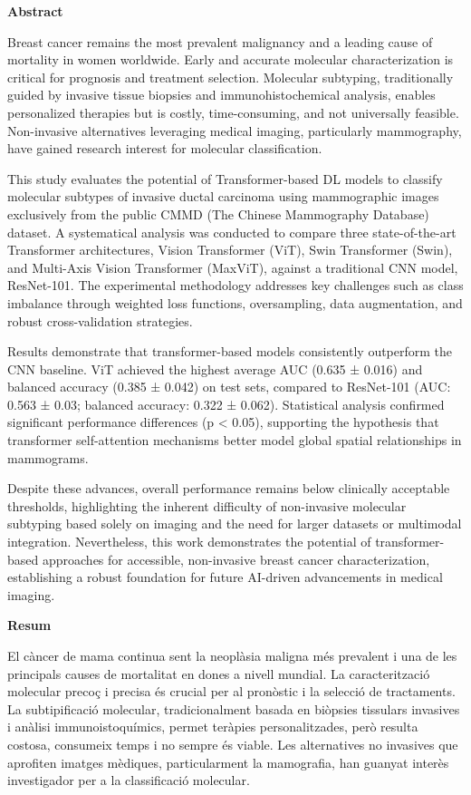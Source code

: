 \documentclass[a4paper,10pt]{book}
\begin{document}
\newpage
{}
\noindent \textbf{\large Abstract}

Breast cancer remains the most prevalent malignancy and a leading cause of mortality in women worldwide. Early and accurate molecular characterization is critical for prognosis and treatment selection. Molecular subtyping, traditionally guided by invasive tissue biopsies and immunohistochemical analysis, enables personalized therapies but is costly, time-consuming, and not universally feasible. Non-invasive alternatives leveraging medical imaging, particularly mammography, have gained research interest for molecular classification.

This study evaluates the potential of Transformer-based DL models to classify molecular subtypes of invasive ductal carcinoma using mammographic images exclusively from the public CMMD (The Chinese Mammography Database)  dataset. A systematical analysis was conducted to compare three state-of-the-art Transformer architectures, Vision Transformer (ViT), Swin Transformer (Swin), and Multi-Axis Vision Transformer (MaxViT), against a traditional CNN model, ResNet-101. The experimental methodology addresses key challenges such as class imbalance through weighted loss functions, oversampling, data augmentation, and robust cross-validation strategies.

Results demonstrate that transformer-based models consistently outperform the CNN baseline. ViT achieved the highest average AUC (0.635 ± 0.016) and balanced accuracy (0.385 ± 0.042) on test sets, compared to ResNet-101 (AUC: 0.563 ± 0.03; balanced accuracy: 0.322 ± 0.062). Statistical analysis confirmed significant performance differences (p < 0.05), supporting the hypothesis that transformer self-attention mechanisms better model global spatial relationships in mammograms.

Despite these advances, overall performance remains below clinically acceptable thresholds, highlighting the inherent difficulty of non-invasive molecular subtyping based solely on imaging and the need for larger datasets or multimodal integration. Nevertheless, this work demonstrates the potential of transformer-based approaches for accessible, non-invasive breast cancer characterization, establishing a robust foundation for future AI-driven advancements in medical imaging.

\newpage
{}
\noindent \textbf{\large Resum}

El càncer de mama continua sent la neoplàsia maligna més prevalent i una de les principals causes de mortalitat en dones a nivell mundial. La caracterització molecular precoç i precisa és crucial per al pronòstic i la selecció de tractaments. La subtipificació molecular, tradicionalment basada en biòpsies tissulars invasives i anàlisi immunoistoquímics, permet teràpies personalitzades, però resulta costosa, consumeix temps i no sempre és viable. Les alternatives no invasives que aprofiten imatges mèdiques, particularment la mamografia, han guanyat interès investigador per a la classificació molecular.
\end{document}
